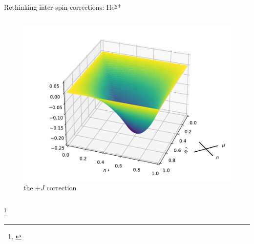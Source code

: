 \documentclass[xcolor=table,aspectratio=169]{beamer}
\newcommand\blfootcite[1]{%
  \begingroup
  \renewcommand\thefootnote{}\footnote{\hspace{-4ex}\cite{#1}}%
  \addtocounter{footnote}{-1}%
  \endgroup
}
\numberwithin{equation}{section}
\begin{document}
\begin{frame}{Rethinking inter-spin corrections: He$\textsuperscript{\emph{x}+}$}
\begin{columns}
        \vspace{-6ex}
        \begin{figure}
            \includegraphics[width=\columnwidth]{figures/j_correction.pdf}
            \caption{the $+J$ correction}
        \end{figure}

    \end{columns}

    \vspace{-2ex}
    \blfootcite{Bajaj2017}
\end{frame}
\end{document}
